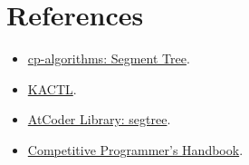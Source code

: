 \section*{References}

\begin{itemize}
  \item \href{https://cp-algorithms.com/data_structures/segment_tree.html}{cp-algorithms: Segment Tree}.
  \item \href{https://github.com/kth-competitive-programming/kactl}{KACTL}.
  \item \href{https://atcoder.github.io/ac-library/production/document_en/segtree.html}{AtCoder Library: segtree}.
  \item \href{https://usaco.guide/CPH.pdf}{Competitive Programmer's Handbook}.
\end{itemize}
